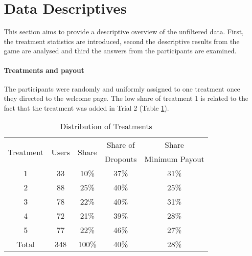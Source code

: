 \section{Data Descriptives}
\label{ch:Experiment:sec:DataacquisitionDescriptives:subsec:DescriptiveStatistics}

This section aims to provide a descriptive overview of the unfiltered data. First, the treatment statistics are introduced, second the descriptive results from the game are analysed and third the answers from the participants are examined.
\paragraph{Treatments and payout}
\label{ch:Evaluation:sec:DescriptiveStatistics:subsec:Distributionoftreatments}

The participants were randomly and uniformly assigned to one treatment once they directed to the welcome page. The low share of treatment 1 is related to the fact that the treatment was added in Trial 2 (Table \ref{Distributionoftreatments}).\\ 
\begin{table}[htbp] %
  \centering
  \caption{Distribution of Treatments}
    \label{Distributionoftreatments}
    \begin{tabular}{ccccc}
    \toprule
    \multirow{2}[1]{*}{Treatment} & \multirow{2}[1]{*}{Users} & \multirow{2}[1]{*}{Share} & Share of  & Share\\
    						   &						&  						 &	Dropouts\footnotemark & Minimum Payout\\
    \midrule
    1     & 33    & 10\%  & 37\% & 31\%\\
    2     & 88    & 25\%  & 40\% & 25\%\\
    3     & 78    & 22\%  & 40\% & 31\%\\
    4     & 72    & 21\%  & 39\% & 28\%\\
    5     & 77    & 22\%  & 46\% & 27\%\\
    
    \bottomrule
    Total & 348   & 100\% & 40\% & 28\%\\
    \end{tabular}%
\end{table}%

